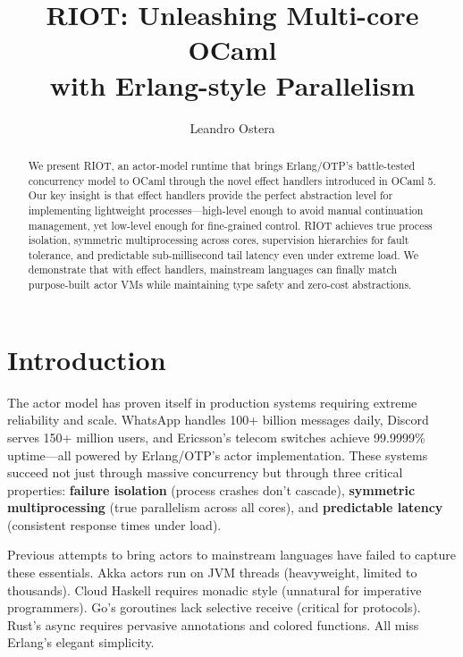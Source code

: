 \documentclass[sigplan,10pt]{acmart}
\begin{document}
\title{RIOT: Unleashing Multi-core OCaml\\with Erlang-style Parallelism}
\author{Leandro Ostera}

\begin{abstract}
\noindent We present RIOT, an actor-model runtime that brings Erlang/OTP's battle-tested concurrency model to OCaml through the novel effect handlers introduced in OCaml 5. Our key insight is that effect handlers provide the perfect abstraction level for implementing lightweight processes—high-level enough to avoid manual continuation management, yet low-level enough for fine-grained control. RIOT achieves true process isolation, symmetric multiprocessing across cores, supervision hierarchies for fault tolerance, and predictable sub-millisecond tail latency even under extreme load. We demonstrate that with effect handlers, mainstream languages can finally match purpose-built actor VMs while maintaining type safety and zero-cost abstractions.
\end{abstract}

\maketitle

\vspace{-0.3cm}
\section{Introduction}

The actor model has proven itself in production systems requiring extreme reliability and scale. WhatsApp handles 100+ billion messages daily, Discord serves 150+ million users, and Ericsson's telecom switches achieve 99.9999\% uptime—all powered by Erlang/OTP's actor implementation. These systems succeed not just through massive concurrency but through three critical properties: \textbf{failure isolation} (process crashes don't cascade), \textbf{symmetric multiprocessing} (true parallelism across all cores), and \textbf{predictable latency} (consistent response times under load).

Previous attempts to bring actors to mainstream languages have failed to capture these essentials. Akka actors run on JVM threads (heavyweight, limited to thousands). Cloud Haskell requires monadic style (unnatural for imperative programmers). Go's goroutines lack selective receive (critical for protocols). Rust's async requires pervasive annotations and colored functions. All miss Erlang's elegant simplicity.
\end{document}
